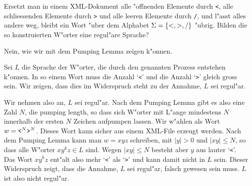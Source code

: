 Ersetzt man in einem XML-Dokument alle "offnenden Elemente durch {\tt <},
alle schliessenden Elemente durch {\tt >} und alle leeren Elemente
durch {\tt /}, und l"asst alles andere weg, bleibt ein Wort "uber
dem Alphabet $\Sigma =\{{\tt <},{\tt >},{\tt /}\}$ "ubrig.
Bilden die so konstruierten W"orter eine regul"are Sprache?

\begin{loesung}
Nein, wie wir mit dem Pumping Lemma zeigen k"onnen.

Sei $L$ die Sprache der W"orter, die durch den genannten Prozess
entstehen k"onnen. In so einem Wort muss die Anzahl `{\tt <}' und die
Anzahl `{\tt >}' gleich gross sein. Wir zeigen, dass dies im Widerspruch
steht zu der Annahme, $L$ sei regul"ar.

Wir nehmen also an, $L$ sei regul"ar. Nach dem Pumping Lemma gibt
es also eine Zahl $N$, die pumping length, so dass sich W"orter mit
L"ange mindestens $N$ innerhalb der ersten $N$ Zeichen aufpumpen lassen.
Wir w"ahlen als Wort $w=\text{\tt <}^N\text{\tt >}^N$. Dieses Wort
kann sicher aus einem XML-File erzeugt werden. Nach dem Pumping
Lemma kann man $w=xyz$ schreiben, mit $|y|>0$ und $|xy|\le N$, so dass
alle W"orter $xy^kz\in L$ sind. Wegen $|xy|\le N$ besteht aber
$y$ aus lauter `{\tt <}'. Das Wort $xy^kz$ ent"alt also mehr
`{\tt <}' als `{\tt >}' und kann damit nicht in $L$ sein. Dieser
Widerspruch zeigt, dass die Annahme, $L$ sei regul"ar, falsch gewesen
sein muss. $L$ ist also nicht regul"ar.
\end{loesung}
